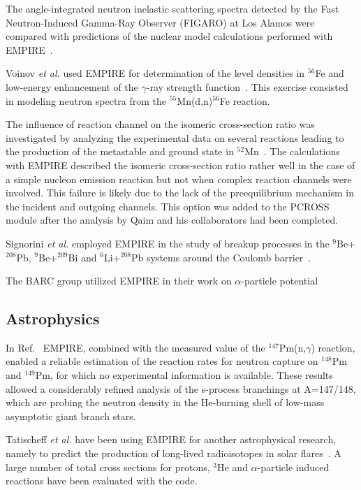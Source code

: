 \documentclass[twocolumn,amsmath,amssymb,10pt,groupedaddress,letter]{revtex4}
\begin{document}
The angle-integrated neutron inelastic scattering spectra detected by the Fast Neutron-Induced Gamma-Ray Observer (FIGARO) at Los Alamos were compared with predictions of the nuclear model calculations performed with EMPIRE~\cite{rochman2004nir}.

Voinov \textit{et al.} used EMPIRE for determination of the level densities in $^{56}$Fe
and low-energy enhancement of the $\gamma$-ray strength function~\cite{Voinov:06}.
This exercise consisted in modeling neutron spectra from the $^{55}$Mn(d,n)$^{56}$Fe reaction.

The influence of reaction channel on the isomeric cross-section ratio was investigated by analyzing the experimental data on several reactions leading to the production of the metastable and ground state in $^{52}$Mn~\cite{Qaim:05}. The calculations with EMPIRE described the isomeric cross-section ratio rather well in the case of a simple nucleon emission reaction but not when complex reaction channels were involved. This failure is likely due to the lack of the preequilibrium mechanism in the incident and outgoing channels. This option was added to the PCROSS module after the analysis by Qaim and his collaborators had been completed.

Signorini \textit{et al.} employed EMPIRE in the study of breakup processes in the $^9$Be+$^{208}$Pb, $^9$Be+$^{209}$Bi and $^6$Li+$^{208}$Pb systems around the Coulomb barrier~\cite{signorini2004bps}.

The BARC group utilized EMPIRE in their work on $\alpha$-particle potential~\cite{Kumar:06}

\subsection{Astrophysics}
In Ref.~\cite{reifarth2003snc} EMPIRE, combined
with the measured value of the $^{147}$Pm(n,$\gamma$) reaction, enabled a reliable estimation of the reaction rates for neutron capture on $^{148}$Pm and $^{149}$Pm, for which no experimental information is available. These results allowed a considerably refined analysis of the s-process branchings at A=147/148, which are probing the neutron density in the He-burning shell of low-mass asymptotic giant branch stars.

Tatischeff \textit{et al.} have been using EMPIRE for another astrophysical research, namely to predict the production of long-lived radioisotopes in solar flares~\cite{Tatischeff:06}. A large number of total cross sections for protons, $^3$He and $\alpha$-particle induced reactions have been evaluated with the code.
\end{document}
